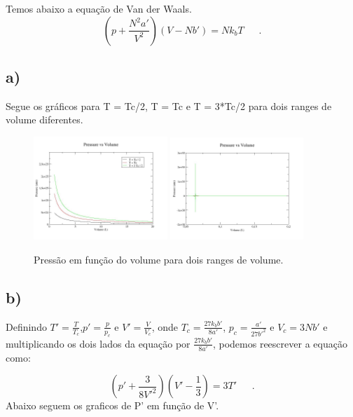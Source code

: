 \documentclass[a4wide]{report}
\begin{document}
Temos abaixo a equação de Van der Waals.
\begin{equation}
\left( p + \frac{N^{2}a'}{V^{2}}		\right)			\left( V - Nb'		\right) = Nk_{b}T
~~~~~~~.
\label{pressao1}
\end{equation}

\subsection*{a)}
Segue os gráficos para T = Tc/2, T = Tc e T = 3*Tc/2 para dois ranges de volume diferentes.


\begin{figure}[h]
\centering
\includegraphics[width=0.45\textwidth]{v_alto.jpg}%
\includegraphics[width=0.447\textwidth]{v_baixo.jpg}
\caption{Pressão em função do volume para dois ranges de volume.}
\label{p1}
\end{figure}

\subsection*{b)}

Definindo $T' = \frac{T}{T_{c}}$,$p' = \frac{p}{p_{c}}$ e $V' = \frac{V}{V_{c}}$, onde $T_{c} =\frac{27k_{b}b'}{8a'}$, $p_{c} =\frac{a'}{27b'^{2}}$ e $V_{c} =3Nb'$ e multiplicando os dois lados da equação por $\frac{27k_{b}b'}{8a'}$, podemos reescrever a equação como:


\begin{equation}
\left( p' + \frac{3}{8V'^{2}}		\right)			\left( V' - \frac{1}{3}		\right) =3T'
~~~~~~~.
\label{pressao2}
\end{equation}
Abaixo seguem os graficos de P' em função de V'.
\end{document}
